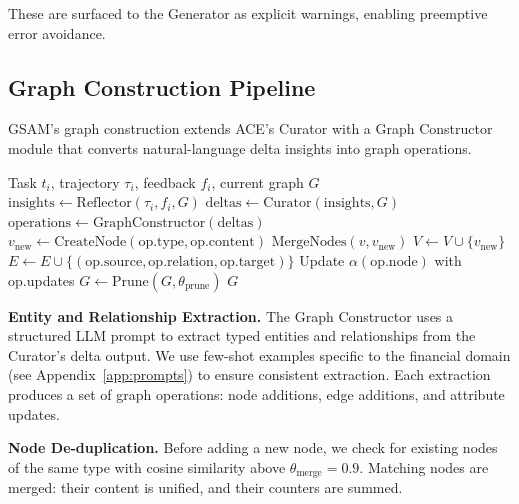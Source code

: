 \documentclass[12pt,a4paper]{article}
\begin{document}
These are surfaced to the Generator as explicit warnings, enabling preemptive error avoidance.


\subsection{Graph Construction Pipeline}
\label{sec:construction}

GSAM's graph construction extends ACE's Curator with a Graph Constructor module that converts natural-language delta insights into graph operations.

\begin{algorithm}[t]
\caption{GSAM Graph Construction Pipeline}
\label{alg:construction}
\begin{algorithmic}[1]
\REQUIRE Task $t_i$, trajectory $\tau_i$, feedback $f_i$, current graph $G$
\STATE $\text{insights} \leftarrow \text{Reflector}(\tau_i, f_i, G)$
\STATE $\text{deltas} \leftarrow \text{Curator}(\text{insights}, G)$
\STATE $\text{operations} \leftarrow \text{GraphConstructor}(\text{deltas})$
        \STATE $v_{\text{new}} \leftarrow \text{CreateNode}(\text{op.type}, \text{op.content})$
            \STATE $\text{MergeNodes}(v, v_{\text{new}})$ 
        \ELSE
            \STATE $V \leftarrow V \cup \{v_{\text{new}}\}$
        \ENDIF
        \STATE $E \leftarrow E \cup \{(\text{op.source}, \text{op.relation}, \text{op.target})\}$
        \STATE Update $\alpha(\text{op.node})$ with op.updates
    \ENDIF
\ENDFOR
\STATE $G \leftarrow \text{Prune}(G, \theta_{\text{prune}})$ 
\RETURN $G$
\end{algorithmic}
\end{algorithm}

\textbf{Entity and Relationship Extraction.} The Graph Constructor uses a structured LLM prompt to extract typed entities and relationships from the Curator's delta output. We use few-shot examples specific to the financial domain (see Appendix~\ref{app:prompts}) to ensure consistent extraction. Each extraction produces a set of graph operations: node additions, edge additions, and attribute updates.

\textbf{Node De-duplication.} Before adding a new node, we check for existing nodes of the same type with cosine similarity above $\theta_{\text{merge}} = 0.9$. Matching nodes are merged: their content is unified, and their counters are summed.
\end{document}
